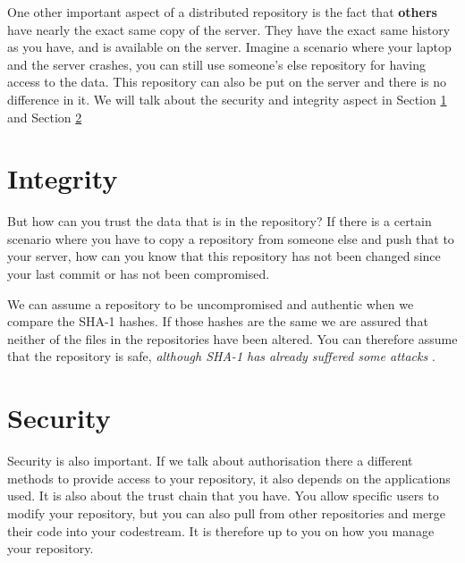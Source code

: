 One other important aspect of a distributed repository is the fact that \textbf{others} have nearly the exact same copy of the server. They have the exact same history as you have, and is available on the server. Imagine a scenario where your laptop and the server crashes, you can still use someone's else repository for having access to the data. This repository can also be put on the server and there is no difference in it. We will talk about the security and integrity aspect in Section \ref{sec:integrity} and Section \ref{sec:security}

\section{Integrity}
\label{sec:integrity}
But how can you trust the data that is in the repository? If there is a certain scenario where you have to copy a repository from someone else and push that to your server, how can you know that this repository has not been changed since your last commit or has not been compromised.

We can assume a repository to be uncompromised and authentic when we compare the SHA-1 hashes. If those hashes are the same we are assured that neither of the files in the repositories have been altered. You can therefore assume that the repository is safe, \textit{although SHA-1 has already suffered some attacks} \cite{sha-1-attacks-wiki}.

\section{Security}
\label{sec:security}
Security is also important. If we talk about authorisation there a different methods to provide access to your repository, it also depends on the applications used. It is also about the trust chain that you have. You allow specific users to modify your repository, but you can also pull from other repositories and merge their code into your codestream. It is therefore up to you on how you manage your repository.
